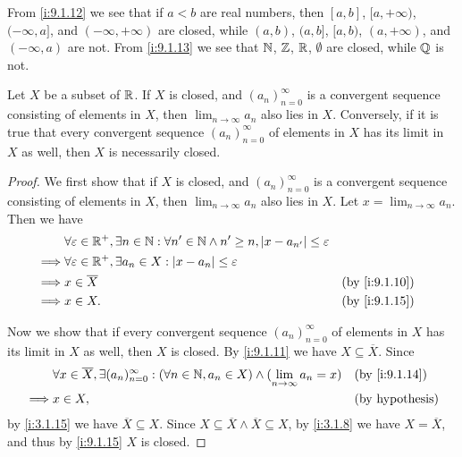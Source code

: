 \begin{eg}\label{i:9.1.16}
  From \cref{i:9.1.12} we see that if \(a < b\) are real numbers, then \([a, b]\), \([a, +\infty)\), \((-\infty, a]\), and \((-\infty, +\infty)\) are closed, while \((a, b)\), \((a, b]\), \([a, b)\), \((a, +\infty)\), and \((-\infty, a)\) are not.
  From \cref{i:9.1.13} we see that \(\mathbb{N}\), \(\mathbb{Z}\), \(\mathbb{R}\), \(\emptyset\) are closed, while \(\mathbb{Q}\) is not.
\end{eg}

\begin{cor}\label{i:9.1.17}
  Let \(X\) be a subset of \(\mathbb{R}\).
  If \(X\) is closed, and \((a_n)_{n = 0}^\infty\) is a convergent sequence consisting of elements in \(X\), then \(\lim_{n \to \infty} a_n\) also lies in \(X\).
  Conversely, if it is true that every convergent sequence \((a_n)_{n = 0}^\infty\) of elements in \(X\) has its limit in \(X\) as well, then \(X\) is necessarily closed.
\end{cor}

\begin{proof}
  We first show that if \(X\) is closed, and \((a_n)_{n = 0}^\infty\) is a convergent sequence consisting of elements in \(X\), then \(\lim_{n \to \infty} a_n\) also lies in \(X\).
  Let \(x = \lim_{n \to \infty} a_n\).
  Then we have
  \begin{align*}
             & \forall \varepsilon \in \R^+, \exists n \in \N : \forall n' \in \N \land n' \geq n, \abs{x - a_{n'}} \leq \varepsilon                    \\
    \implies & \forall \varepsilon \in \R^+, \exists a_n \in X : \abs{x - a_n} \leq \varepsilon                                                         \\
    \implies & x \in \overline{X}                                                                                                    &  & \by{i:9.1.10} \\
    \implies & x \in X.                                                                                                              &  & \by{i:9.1.15}
  \end{align*}

  Now we show that if every convergent sequence \((a_n)_{n = 0}^\infty\) of elements in \(X\) has its limit in \(X\) as well, then \(X\) is closed.
  By \cref{i:9.1.11} we have \(X \subseteq \overline{X}\).
  Since
  \begin{align*}
             & \forall x \in \overline{X}, \exists (a_n)_{n = 0}^\infty : (\forall n \in \N, a_n \in X) \land (\lim_{n \to \infty} a_n = x) &  & \by{i:9.1.14}          \\
    \implies & x \in X,                                                                                                                     &  & \text{(by hypothesis)}
  \end{align*}
  by \cref{i:3.1.15} we have \(\overline{X} \subseteq X\).
  Since \(X \subseteq \overline{X} \land \overline{X} \subseteq X\), by \cref{i:3.1.8} we have \(X = \overline{X}\), and thus by \cref{i:9.1.15} \(X\) is closed.
\end{proof}

